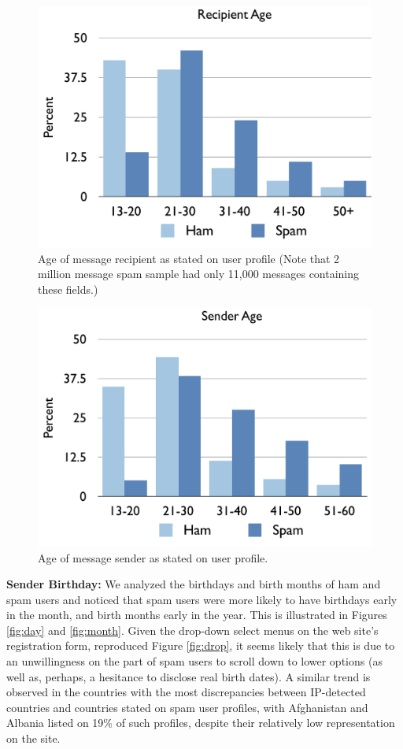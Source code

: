 \documentclass[preprint]{acm_proc_article-sp}
\begin{document}
\begin{figure}[h]
    \centering
    \includegraphics[width=\linewidth]{figures/recip-age.pdf}
    \caption{Age of message recipient as stated on user profile (Note that 2 million message spam sample 
        had only 11,000 messages containing these fields.)}
    \label{fig:recipage}
\end{figure}

\begin{figure}[h]
    \centering
    \includegraphics[width=\linewidth]{figures/sender-age.pdf}
    \caption{Age of message sender as stated on user profile. }
    \label{fig:sendage}
\end{figure}

\textbf{Sender Birthday:} We analyzed the birthdays and birth months of ham and spam users and noticed that spam users 
were more likely to have birthdays early in the month, and birth months early in the year. This is illustrated in 
Figures \ref{fig:day} and \ref{fig:month}. Given the drop-down select menus on the web site's registration form, reproduced 
Figure \ref{fig:drop}, it seems likely that this is due to an unwillingness on the part of spam users to 
scroll down to lower options (as well as, perhaps, a hesitance to disclose real birth dates). A similar trend is 
observed in the countries with the most discrepancies between IP-detected countries and countries stated on spam 
user profiles, with Afghanistan and Albania listed on 19\% of such profiles, despite their relatively low 
representation on the site. 
\end{document}
